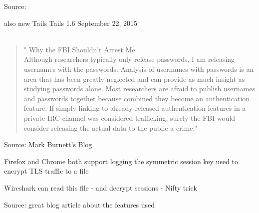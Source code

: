 \documentclass[20pt,landscape,a4paper,footrule]{foils}
\begin{document}
Source:
\\

also new Tails Tails 1.6 September 22, 2015 \\
\\





\begin{quote}
"  Why the FBI Shouldn't Arrest Me\\
  Although researchers typically only release passwords, I am releasing usernames with the passwords. Analysis of usernames with passwords is an area that has been greatly neglected and can provide as much insight as studying passwords alone. Most researchers are afraid to publish usernames and passwords together because combined they become an authentication feature. If simply linking to already released authentication features in a private IRC channel was considered trafficking, surely the FBI would consider releasing the actual data to the public a crime."
\end{quote}

Source: Mark Burnett's Blog\\




\begin{list1}
\item  Firefox and Chrome both support logging the symmetric session key used to encrypt TLS traffic to a file
\item Wireshark can read this file - and decrypt sessions - Nifty trick
\end{list1}


Source: great blog article about the features used\\
{\tiny{}}



\end{document}
